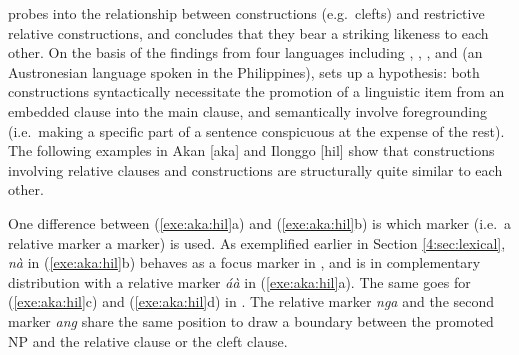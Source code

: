 \citet{schachter:73} probes into the relationship between 
constructions (e.g.\ clefts) and restrictive relative
constructions, and concludes that they bear a striking likeness to
each other. On the basis of the findings from four languages including
, , , and  (an
Austronesian language spoken in the Philippines),
\citeauthor{schachter:73} sets up a hypothesis: both constructions
syntactically necessitate the promotion of a linguistic item from an
embedded clause into the main clause, and semantically involve
foregrounding (i.e.\ making a specific part of a sentence conspicuous
at the expense of the rest). The following examples in Akan [aka] and
Ilonggo [hil] show that constructions involving relative clauses and
 constructions are structurally quite similar to each other.





\noindent One difference between (\ref{exe:aka:hil}a) and
(\ref{exe:aka:hil}b) is which marker (i.e.\ a relative marker \vs a
 marker) is used. As exemplified earlier in
Section \ref{4:sec:lexical}, \textit{n\`{a}} in (\ref{exe:aka:hil}b) behaves
as a focus marker in , and is in complementary distribution
with a relative marker \textit{\'{a}\`{a}} in
(\ref{exe:aka:hil}a). The same goes for (\ref{exe:aka:hil}c) and
(\ref{exe:aka:hil}d) in . The
relative marker \textit{nga} and the second  marker \textit{ang}
share the same position to draw a boundary between the promoted NP and
the relative clause or the cleft clause.




